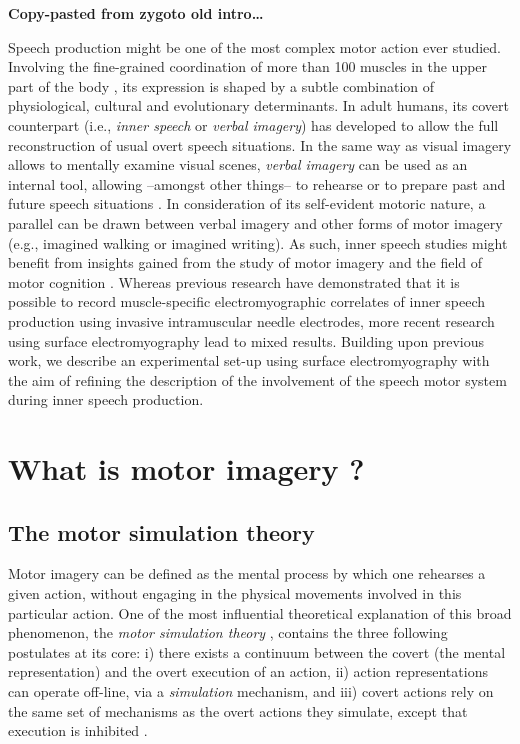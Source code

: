\documentclass[a4paper,11pt,oneside,oldfontcommands]{memoir}
\begin{document}
\textbf{Copy-pasted from zygoto old intro\ldots{}}

Speech production might be one of the most complex motor action ever
studied. Involving the fine-grained coordination of more than 100
muscles in the upper part of the body \citep{simonyan_laryngeal_2011},
its expression is shaped by a subtle combination of physiological,
cultural and evolutionary determinants. In adult humans, its covert
counterpart (i.e., \emph{inner speech} or \emph{verbal imagery}) has
developed to allow the full reconstruction of usual overt speech
situations. In the same way as visual imagery allows to mentally examine
visual scenes, \emph{verbal imagery} can be used as an internal tool,
allowing --amongst other things-- to rehearse or to prepare past and
future speech situations \citep[for a review,
see][]{perrone-bertolotti_what_2014}. In consideration of its
self-evident motoric nature, a parallel can be drawn between verbal
imagery and other forms of motor imagery (e.g., imagined walking or
imagined writing). As such, inner speech studies might benefit from
insights gained from the study of motor imagery and the field of motor
cognition \citep[e.g.,][]{haggard_conscious_2005, jeannerod_motor_2006}.
Whereas previous research have demonstrated that it is possible to
record muscle-specific electromyographic correlates of inner speech
production using invasive intramuscular needle electrodes, more recent
research using surface electromyography lead to mixed results. Building
upon previous work, we describe an experimental set-up using surface
electromyography with the aim of refining the description of the
involvement of the speech motor system during inner speech production.

\section{What is motor imagery ?}\label{what-is-motor-imagery}

\subsection{The motor simulation
theory}\label{the-motor-simulation-theory}

Motor imagery can be defined as the mental process by which one
rehearses a given action, without engaging in the physical movements
involved in this particular action. One of the most influential
theoretical explanation of this broad phenomenon, the \emph{motor
simulation theory}
\citep[MST;][]{jeannerod_representing_1994, jeannerod_neural_2001, jeannerod_motor_2006},
contains the three following postulates at its core: i) there exists a
continuum between the covert (the mental representation) and the overt
execution of an action, ii) action representations can operate off-line,
via a \emph{simulation} mechanism, and iii) covert actions rely on the
same set of mechanisms as the overt actions they simulate, except that
execution is inhibited \citep{oshea_does_2017}.
\end{document}

